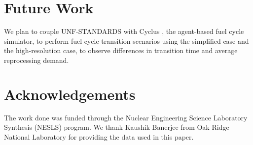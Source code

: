 \documentclass{anstrans}
\begin{document}
\section{Future Work}
We plan to couple \gls{UNF-STANDARDS} with Cyclus \cite{huff_fundamental_2016-1}, the agent-based fuel cycle simulator,
to perform fuel cycle transition scenarios using the simplified case
and the high-resolution case, to observe differences in transition
time and average reprocessing demand.



\section{Acknowledgements}
The work done was funded through the Nuclear Engineering Science
Laboratory Synthesis (NESLS) program. We thank Kaushik Banerjee
from Oak Ridge National Laboratory for providing the data used
in this paper.



\end{document}
